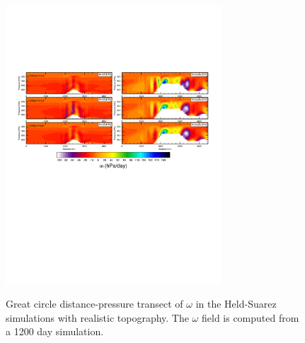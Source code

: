 \documentclass[twocol]{ametsoc}
\begin{document}
\begin{figure}[t]
\noindent\includegraphics[width=19pc,angle=0]{figs/FHS-transect-CROP.pdf}\\
\caption{Great circle distance-pressure transect of $\omega$ in the Held-Suarez simulations with realistic topography. The $\omega$ field is computed from a 1200 day simulation.}
\label{fig:FHS-transect}
\end{figure}
\end{document}
